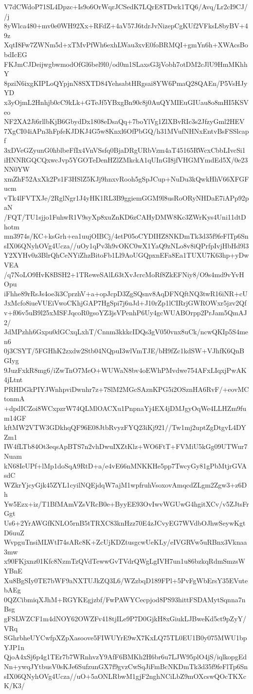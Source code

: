 V7dCWdoP71SL4Dpzc+Is9o6OrWqrJCSedK7LQrE8TDwk1TQ6/Avq/Lr2cI9CJ//j
8yWlca480+mv0e0WH92Xx+RFdZ+4aV57J6tdrJvNizepCgKUf2VFksL8byBV+49z
XqtI8Fw7ZWNm5d+xTMvPfWh6exhLWau3xvE0foBRMQI+gmYn6h+XWAcsBobdIcEG
FKJmCJDeijwgbwmodOfGl6bel9l0/od0m1SLaxsG3jVobh7otDM2cJlU9HmMKhhY
8pziN6ixgKIPLoQYpjnN8SXTD84YehsabtHRgsai8YW6PmaQ28QAEn/P5VsHJyYD
x3yOjmL2Hnhjb0cC9kLk+GTeJf5YBxgBn90c8j0AuQYMIEuGIUau8o8mHI5KSVeo
NF2XA2Ji6rllbKjB6GbydDx1808eDsaQq+7boYlVg1ZlXBvRIc3s2JfzyGml2HEV
7XgCI04iAPn3hFpfeKJDKJ4G5w8Knxl6OfPbGQ/h31MVufNHNxEntvBsFSSlcapf
3xDVeGZyunG0hblbeFfIx4VnVSsfq0BjaDRgURbVzm4aT45165RWcxCbbLIvcSi1
iHNNRGQCQxwcJvp5YGOTeDenHZlZMkckA1qUInGI8jfVHGMYmdEd5X/0e23NN0YW
xmZhF52AxXk2Ps1F3HSlZ5KJj9hnxvRooh5gSpJCup+NuDu3kQwkHhV66XFGFucm
vTk4lFVTXJe/2RglNgr1J4yHK1RL3B9ggiemGGM9l8usRoORyNHDaE7iAPp92paN
/FQT/TU1sjjo1FuhwR1V9syXp8xuZnKD6zCAHyDMW8Kc3ZWrKys4Uni11dtDhotm
mn3974s/KC+ksGrh+ea1uujOIBCj/4etP05oCYDIHZ8NKDmTk3d35f9feFlTp6Sn
sIX06QNyhOVg4Ucza//uOy1qPv3h9vOKC0wX1YaQ9zNLo8v8iQPrfpIvjHbHd9l3
Y2XYHv0z3BlrQhCeNYiZhzBitoFb1Ll9AoUGQpxnEFa8Ea1TUXU7K63hp+yDwVEA
/q7NoLO9HvK8BSH2+1TReweSAlL63tXvJcrcMoRf8ZkEFNiy8/O9s4md9vYvHOpu
iFhhe89rRsJs4oe3i3CprzhV+a+opJcpD3ZgSQsnv8AqDFNQftNQ3twR16iNR+cU
JxMcfo8iueVUEiVwoCKhjGAP7HgSpi7j6uJd+J10rZp1lCIRrjGWROWxr5jzv2Qf
v+f06v5uB9l25xMSFJqcoR0gsoYZ3jsVPenhP6Uy4gcWUABOrpp2PrJam5QmAJ2/
JdMPzhh6Gxpu0dGCxqLxhT/Cnnm3kkkcIDQs3gV050vnx8uCk/ncwQKIp5S4men6
0j3CSYT/5FGHhK2zxdw2Stb04NQpuI3wlVmTJE/bH9fZc1kdSW+VJhfK6QnBGIyg
9JuzFxkR8mg6/iZwTnO7MeO+WUWaN8bv4oEWhPMvdwe754AFxLIqxjPwAK4jLtnt
PRHDGkPIYJWnhpviDwnhr7z+7SlM2MGcSAznKPG5i2OSznHA6RvF/+eovMCtonmA
+dpdICZoi8WCxpzrW74QLMlOACXu1PnpnaYj4EX4jDMJgyOqWe4LLHZm9fum14GF
kftMW2VTW3GDkhqQF96E08JtbRvyzFYQ23iKj921//Tw1mj2uptZgDtgvL4DYZm1
IW4fLTb84Ot3eqsApBTS7n2vhDwuIXZtKlz+WO6FtT+FVMiU5kGg09UTWur7Nuam
kN68IeUPf+lMp1doSqA9RtD+a/e4vE66nMNKKHe5pp7TwcyGy81gPbMtjrGVAsdC
WZkrYjcyGjk45ZYL1cyilNQEjdqW7ajM1wpfruhVsoxovAmqcdZLgm2Zgw3+z6Dh
Yw5Ezx+iz/T1BfMAmVZsVRcB0e+ByyEE93OvIwvWGUwG4hgitXCv/v5ZJtsFrGgt
Us6+2YrAWGfKNLO5rnB5tTRXC83knHzz70E4zJCvyEG7WVdbOJhwSeywKgtD6uuZ
WvpguTnsiMLWtI74sARc8K+ZcUjKDZtusgcwUeKLy/eIVGRVw5uRBnx3Vknaa3mw
x90FKjxnz01Kfc8NzmTzQVdTewwGvTVdrQWgLgIVH7un1u86bzkqRdmSmzsWYBnE
Xu8BgSIy0TE7bWF9aNXTUJkZQ3L6/WZzbqD189FPl+5PvFgWbErsY35EVutebAEg
0QZCibmiqXJhM+RGYKEgjzbf/FwPAWYCecpjod8PS93hittFSDAMytSqnna7nBsg
gFSLWZCF1m4dNOY62OWZFv418tjILe9P7D0GjkH8xGiukLJBweKd5ct9pZyY/VRq
SGhrbheUYCwfpXZpXasoove5FIWUYrE9wX7KxLQ75TL0EU1B0y075MWU1bpYJP1n
QjoA4xSj6p4g1TEr7b7WRnhvzY9AfF6BMKh2H6br6u7LJW95plO4jS/iqlkopgEd
Nn+ywqJYtbusV0sKJe6SufzunGX7f9gvzCwSqJiFmBcNKDmTk3d35f9feFlTp6Sn
sIX06QNyhOVg4Ucza//uO+5aONLRbwM1gjF2nghNCiLbZ9mOXcswQOcTKXcK/K3/
